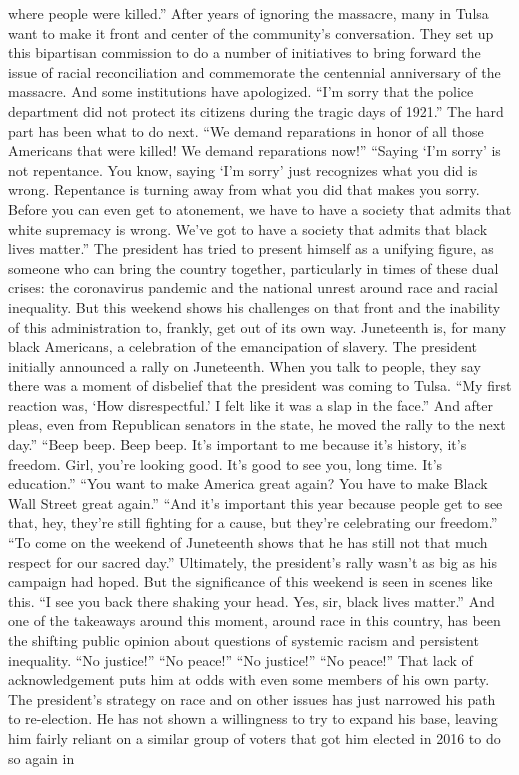 \begin{itemize}
  where people were killed.'' After years of ignoring the massacre, many
  in Tulsa want to make it front and center of the community's
  conversation. They set up this bipartisan commission to do a number of
  initiatives to bring forward the issue of racial reconciliation and
  commemorate the centennial anniversary of the massacre. And some
  institutions have apologized. ``I'm sorry that the police department
  did not protect its citizens during the tragic days of 1921.'' The
  hard part has been what to do next. ``We demand reparations in honor
  of all those Americans that were killed! We demand reparations now!''
  ``Saying `I'm sorry' is not repentance. You know, saying `I'm sorry'
  just recognizes what you did is wrong. Repentance is turning away from
  what you did that makes you sorry. Before you can even get to
  atonement, we have to have a society that admits that white supremacy
  is wrong. We've got to have a society that admits that black lives
  matter.'' The president has tried to present himself as a unifying
  figure, as someone who can bring the country together, particularly in
  times of these dual crises: the coronavirus pandemic and the national
  unrest around race and racial inequality. But this weekend shows his
  challenges on that front and the inability of this administration to,
  frankly, get out of its own way. Juneteenth is, for many black
  Americans, a celebration of the emancipation of slavery. The president
  initially announced a rally on Juneteenth. When you talk to people,
  they say there was a moment of disbelief that the president was coming
  to Tulsa. ``My first reaction was, `How disrespectful.' I felt like it
  was a slap in the face.'' And after pleas, even from Republican
  senators in the state, he moved the rally to the next day.'' ``Beep
  beep. Beep beep. It's important to me because it's history, it's
  freedom. Girl, you're looking good. It's good to see you, long time.
  It's education.'' ``You want to make America great again? You have to
  make Black Wall Street great again.'' ``And it's important this year
  because people get to see that, hey, they're still fighting for a
  cause, but they're celebrating our freedom.'' ``To come on the weekend
  of Juneteenth shows that he has still not that much respect for our
  sacred day.'' Ultimately, the president's rally wasn't as big as his
  campaign had hoped. But the significance of this weekend is seen in
  scenes like this. ``I see you back there shaking your head. Yes, sir,
  black lives matter.'' And one of the takeaways around this moment,
  around race in this country, has been the shifting public opinion
  about questions of systemic racism and persistent inequality. ``No
  justice!'' ``No peace!'' ``No justice!'' ``No peace!'' That lack of
  acknowledgement puts him at odds with even some members of his own
  party. The president's strategy on race and on other issues has just
  narrowed his path to re-election. He has not shown a willingness to
  try to expand his base, leaving him fairly reliant on a similar group
  of voters that got him elected in 2016 to do so again in
\end{itemize}

